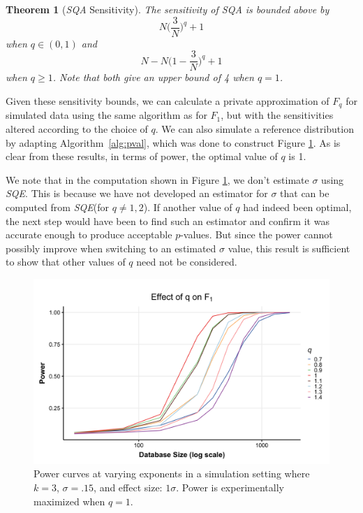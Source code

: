 \documentclass[USenglish,oneside]{article}
\newcounter{ag}
\newcounter{ab}
\newcounter{ar}
\newcounter{ms}
\newtheorem{theorem}{Theorem}
\newcommand{\dbsize}{\ensuremath{N}\xspace}
\newcommand{\sqa}{\textit{SQA}\xspace}
\newcommand{\sqe}{\textit{SQE}\xspace}
\begin{document}
\begin{theorem}[\sqa Sensitivity]\label{thm:SQAsens} The sensitivity of \sqa is bounded above by 
\begin{equation*}
\dbsize\bigg(\frac{3}{\dbsize}\bigg)^q + 1
\end{equation*}
when $q \in (0,1)$ and
\begin{equation*}
\dbsize-\dbsize\bigg(1-\frac{3}{\dbsize}\bigg)^q + 1
\end{equation*}
when $q \geq 1$. Note that both give an upper bound of 4 when $q = 1$.
\end{theorem}


Given these sensitivity bounds, we can calculate a private approximation of $F_q$ for simulated data using the same algorithm as for $F_1$, but with the sensitivities altered according to the choice of $q$.  We can also simulate a reference distribution by adapting Algorithm~\ref{alg:pval}, which was done to construct Figure \ref{fig:fqpower}.  As is clear from these results, in terms of power, the optimal value of $q$ is 1.

We note that in the computation shown in Figure \ref{fig:fqpower}, we don't estimate $\sigma$ using \sqe.  This is because we have not developed an estimator for $\sigma$ that can be computed from \sqe (for $q \ne 1, 2$).  If another value of $q$ had indeed been optimal, the next step would have been to find such an estimator and confirm it was accurate enough to produce acceptable $p$-values.  But since the power cannot possibly improve when switching to an estimated $\sigma$ value, this result is sufficient to show that other values of $q$ need not be considered.


\begin{figure}
\centering
\includegraphics[width=\linewidth]{images/fq-power.png}
\caption{Power curves at varying exponents in a simulation setting where $k = 3$, $\sigma = .15$, and effect size: $1\sigma$. Power is experimentally maximized when $q = 1$.}\label{fig:fqpower}
\end{figure}
\end{document}
